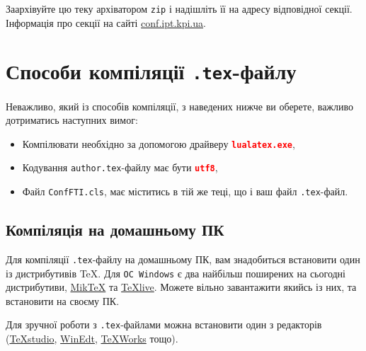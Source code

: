 \documentclass[]{iptconf}
\begin{document}
Заархівуйте цю теку архіватором \texttt{zip} і надішліть її на адресу відповідної секції. Інформація про секції на сайті \url{conf.ipt.kpi.ua}.





\section{Способи компіляції \texttt{.tex}-файлу}





Неважливо, який із способів компіляції, з наведених нижче ви оберете, важливо дотриматись наступних вимог:
\begin{tcolorbox}[breakable,enhanced,arc=0mm,colback=gray!5,colframe=red!80!black,leftrule=2mm]
	\begin{itemize}
		\item Компілювати необхідно за допомогою драйверу \textcolor{red}{\textbf{\texttt{lualatex.exe}}},
		\item Кодування \texttt{author.tex}-файлу  має бути \textcolor{red}{\textbf{\texttt{utf8}}},
		\item Файл \texttt{ConfFTI.cls}, має міститись в тій же теці, що і ваш файл \texttt{.tex}-файл.
	\end{itemize}
\end{tcolorbox}





\subsection{Компіляція на домашньому ПК}





Для компіляції \texttt{.tex}-файлу на домашньому ПК, вам знадобиться встановити один із дистрибутивів \TeX. Для \texttt{ОС Windows} є два найбільш поширених на сьогодні дистрибутиви, \href{http://miktex.org/}{Mik\TeX} та \href{https://www.tug.org/texlive/}{\TeX live}. Можете вільно завантажити якийсь із них, та встановити на своєму ПК.

Для зручної роботи з \texttt{.tex}-файлами можна встановити один з редакторів (\href{http://texstudio.sourceforge.net/}{\TeX studio}, \href{http://www.winedt.com/download.html}{WinEdt}, \href{https://www.tug.org/texworks/}{\TeX Works} тощо).
\end{document}
